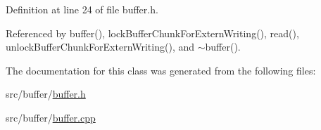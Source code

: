Definition at line 24 of file buffer.h.



Referenced by buffer(), lockBufferChunkForExternWriting(), read(), unlockBufferChunkForExternWriting(), and $\sim$buffer().



The documentation for this class was generated from the following files:\begin{DoxyCompactItemize}
\item 
src/buffer/\hyperlink{buffer_8h}{buffer.h}\item 
src/buffer/\hyperlink{buffer_8cpp}{buffer.cpp}\end{DoxyCompactItemize}
